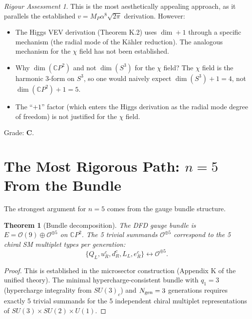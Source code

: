 \documentclass[11pt]{article}
\newtheorem{theorem}{Theorem}[section]
\theoremstyle{definition}
\theoremstyle{remark}
\newtheorem*{assessment}{Rigour Assessment}
\newcommand{\CP}{\mathbb{C}P}
\begin{document}
\begin{assessment}
This is the most aesthetically appealing approach, as it parallels the
established $v = M_P\alpha^8\sqrt{2\pi}$ derivation. However:
\begin{itemize}
\item The Higgs VEV derivation (Theorem K.2) uses $\dim + 1$ through a specific
  mechanism (the radial mode of the K\"ahler reduction). The analogous mechanism
  for the $\chi$ field has not been established.
\item Why $\dim(\CP^2)$ and not $\dim(S^3)$ for the $\chi$ field? The $\chi$
  field is the harmonic 3-form on $S^3$, so one would naively expect
  $\dim(S^3) + 1 = 4$, not $\dim(\CP^2) + 1 = 5$.
\item The ``$+1$'' factor (which enters the Higgs derivation as the radial mode
  degree of freedom) is not justified for the $\chi$ field.
\end{itemize}

Grade: \textbf{C}.
\end{assessment}


\section{The Most Rigorous Path: $n = 5$ From the Bundle}
\label{sec:bundle}

The strongest argument for $n = 5$ comes from the gauge bundle structure.

\begin{theorem}[Bundle decomposition]
\label{thm:bundle}
The DFD gauge bundle is $E = \mathcal{O}(9) \oplus \mathcal{O}^{\oplus 5}$
on $\CP^2$. The 5 trivial summands $\mathcal{O}^{\oplus 5}$ correspond to
the 5 chiral SM multiplet types per generation:
\begin{equation}
\{Q_L, u_R^c, d_R^c, L_L, e_R^c\} \longleftrightarrow \mathcal{O}^{\oplus 5}.
\end{equation}
\end{theorem}

\begin{proof}
This is established in the microsector construction (Appendix K of the unified
theory). The minimal hypercharge-consistent bundle with $q_1 = 3$
(hypercharge integrality from $SU(3)_c$) and $N_{\rm gen} = 3$ generations
requires exactly 5 trivial summands for the 5 independent chiral multiplet
representations of $SU(3) \times SU(2) \times U(1)$.
\end{proof}
\end{document}
